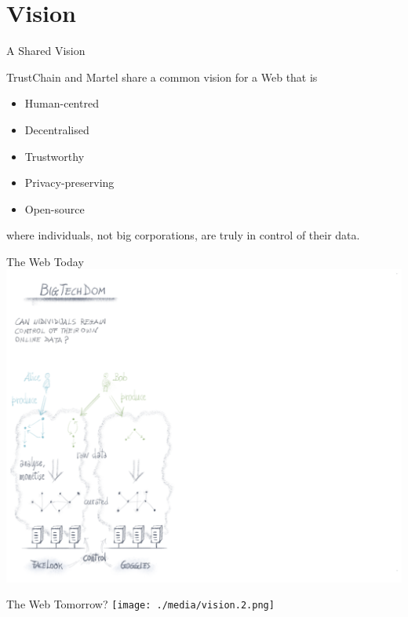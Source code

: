 \section{Vision}


\begin{frame}{A Shared Vision}

\alert{TrustChain and Martel share a common vision} for a Web that
is
\begin{itemize}
    \item Human-centred
    \item Decentralised
    \item Trustworthy
    \item Privacy-preserving
    \item Open-source
\end{itemize}
where individuals, not big corporations, are truly in control of
their data.

\end{frame}


\begin{frame}{The Web Today}
  \includegraphics[height=0.85\paperheight]{./media/vision.1.png}
\end{frame}


\begin{frame}{The Web Tomorrow?}
  \texttt{[image: ./media/vision.2.png]}
\end{frame}


